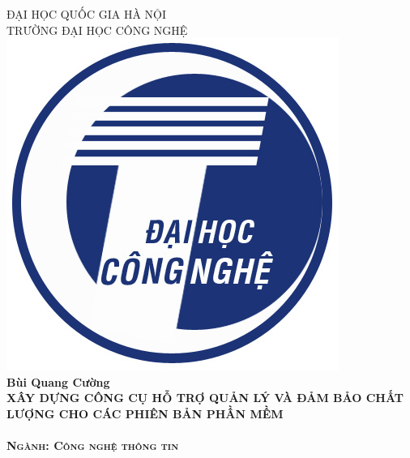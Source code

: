\documentclass[12pt]{article}
\date{}
\begin{document}
	\begin{titlepage}		
		\center %
		
		
		\textsc{\Large ĐẠI HỌC QUỐC GIA HÀ NỘI\\ TRƯỜNG ĐẠI HỌC CÔNG NGHỆ}\\[1cm] %
		
		
		\includegraphics[width=0.2\linewidth]{images/uet}\\[1cm] %
		
		
		{\Large  \bfseries Bùi Quang Cường}\\[2cm]
		
		
		{ \LARGE \bfseries XÂY DỰNG CÔNG CỤ HỖ TRỢ QUẢN LÝ VÀ ĐẢM BẢO CHẤT LƯỢNG CHO CÁC PHIÊN BẢN PHẦN MỀM}\\[0.5cm] %
		
		\hfill\\[3cm]
		
		\textsc{\Large \bfseries Ngành: Công nghệ thông tin}
		

\end{titlepage}
\end{document}
